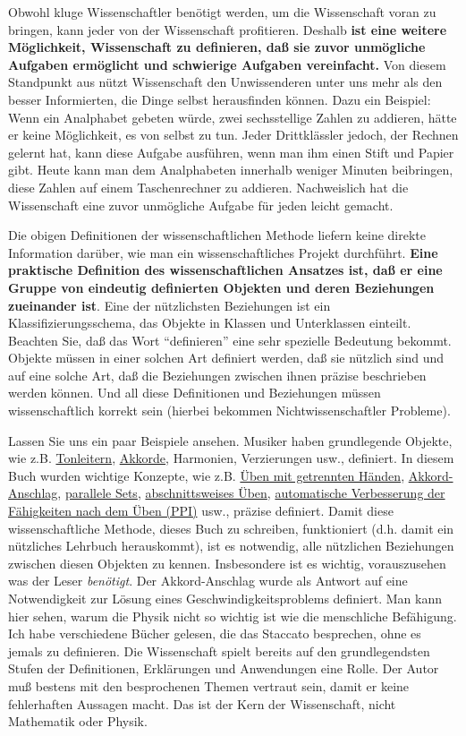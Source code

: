 Obwohl kluge Wissenschaftler benötigt werden, um die Wissenschaft voran zu bringen, kann jeder von der Wissenschaft profitieren.
 Deshalb \textbf{ist eine weitere Möglichkeit, Wissenschaft zu definieren, daß sie zuvor unmögliche Aufgaben ermöglicht und schwierige Aufgaben vereinfacht.}
 Von diesem Standpunkt aus nützt Wissenschaft den Unwissenderen unter uns mehr als den besser Informierten, die Dinge selbst herausfinden können.
 Dazu ein Beispiel: Wenn ein Analphabet gebeten würde, zwei sechsstellige Zahlen zu addieren, hätte er keine Möglichkeit, es von selbst zu tun.
 Jeder Drittklässler jedoch, der Rechnen gelernt hat, kann diese Aufgabe ausführen, wenn man ihm einen Stift und Papier gibt.
 Heute kann man dem Analphabeten innerhalb weniger Minuten beibringen, diese Zahlen auf einem Taschenrechner zu addieren.
 Nachweislich hat die Wissenschaft eine zuvor unmögliche Aufgabe für jeden leicht gemacht.
 

Die obigen Definitionen der wissenschaftlichen Methode liefern keine direkte Information darüber, wie man ein wissenschaftliches Projekt durchführt.
 \textbf{Eine praktische Definition des wissenschaftlichen Ansatzes ist, daß er eine Gruppe von eindeutig definierten Objekten und deren Beziehungen zueinander ist}.
 Eine der nützlichsten Beziehungen ist ein Klassifizierungsschema, das Objekte in Klassen und Unterklassen einteilt.
 Beachten Sie, daß das Wort \enquote{definieren} eine sehr spezielle Bedeutung bekommt.
 Objekte müssen in einer solchen Art definiert werden, daß sie nützlich sind und auf eine solche Art, daß die Beziehungen zwischen ihnen präzise beschrieben werden können.
 Und all diese Definitionen und Beziehungen müssen wissenschaftlich korrekt sein (hierbei bekommen Nichtwissenschaftler Probleme).
 

Lassen Sie uns ein paar Beispiele ansehen.
 Musiker haben grundlegende Objekte, wie z.B. \hyperlink{c1iii5a}{Tonleitern}, \hyperlink{c1iii7e}{Akkorde}, Harmonien, Verzierungen usw., definiert.
 In diesem Buch wurden wichtige Konzepte, wie z.B. \hyperlink{c1ii7}{Üben mit getrennten Händen}, \hyperlink{c1ii9}{Akkord-Anschlag}, \hyperlink{c1ii11}{parallele Sets}, \hyperlink{c1ii5}{abschnittsweises Üben}, \hyperlink{c1ii15}{automatische Verbesserung der Fähigkeiten nach dem Üben (PPI)} usw., präzise definiert.
 Damit diese wissenschaftliche Methode, dieses Buch zu schreiben, funktioniert (d.h. damit ein nützliches Lehrbuch herauskommt), ist es notwendig, alle nützlichen Beziehungen zwischen diesen Objekten zu kennen.
 Insbesondere ist es wichtig, vorauszusehen was der Leser \textit{benötigt}.
 Der Akkord-Anschlag wurde als Antwort auf eine Notwendigkeit zur Lösung eines Geschwindigkeitsproblems definiert.
 Man kann hier sehen, warum die Physik nicht so wichtig ist wie die menschliche Befähigung.
 Ich habe verschiedene Bücher gelesen, die das Staccato besprechen, ohne es jemals zu definieren.
 Die Wissenschaft spielt bereits auf den grundlegendsten Stufen der Definitionen, Erklärungen und Anwendungen eine Rolle.
 Der Autor muß bestens mit den besprochenen Themen vertraut sein, damit er keine fehlerhaften Aussagen macht.
 Das ist der Kern der Wissenschaft, nicht Mathematik oder Physik.
 

